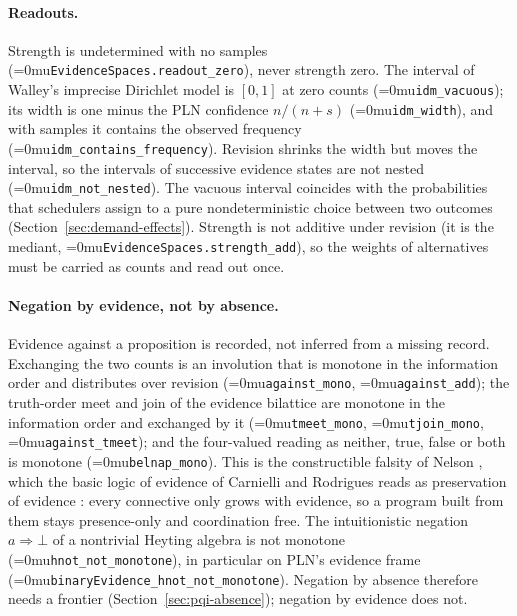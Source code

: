 \documentclass[11pt]{article}
\newcommand{\leanname}[1]{\textup{\Urlmuskip=0mu\relax\nolinkurl{#1}}}
\theoremstyle{definition}
\theoremstyle{remark}
\begin{document}
\paragraph{Readouts.}
Strength is undetermined with no samples
(\leanname{EvidenceSpaces.readout_zero}), never strength zero.  The interval of
Walley's imprecise Dirichlet model \cite{WalleyBagOfMarbles} is $[0,1]$ at zero
counts (\leanname{idm_vacuous}); its width is one minus the PLN confidence
$n/(n+s)$ (\leanname{idm_width}), and with samples it contains the observed
frequency (\leanname{idm_contains_frequency}).  Revision shrinks the width but
moves the interval, so the intervals of successive evidence states are not
nested (\leanname{idm_not_nested}).  The vacuous interval coincides with the
probabilities that schedulers assign to a pure nondeterministic choice between
two outcomes (Section~\ref{sec:demand-effects}).  Strength is not additive
under revision (it is the mediant, \leanname{EvidenceSpaces.strength_add}), so
the weights of alternatives must be carried as counts and read out once.

\paragraph{Negation by evidence, not by absence.}
Evidence against a proposition is recorded, not inferred from a missing
record.  Exchanging the two counts is an involution that is monotone in the
information order and distributes over revision
(\leanname{against_mono}, \leanname{against_add}); the truth-order meet and join
of the evidence bilattice are monotone in the information order and exchanged
by it (\leanname{tmeet_mono}, \leanname{tjoin_mono}, \leanname{against_tmeet}); and
the four-valued reading as neither, true, false or both \cite{BelnapFourValued}
is monotone (\leanname{belnap_mono}).  This is the constructible falsity of
Nelson \cite{NelsonConstructibleFalsity}, which the basic logic of evidence of
Carnielli and Rodrigues reads as preservation of evidence
\cite{CarnielliRodriguesLET}: every connective only grows with evidence, so a
program built from them stays presence-only and coordination free.  The
intuitionistic negation $a\Rightarrow\bot$ of a nontrivial Heyting algebra is
not monotone (\leanname{hnot_not_monotone}), in particular on PLN's evidence
frame (\leanname{binaryEvidence_hnot_not_monotone}).  Negation by absence
therefore needs a frontier (Section~\ref{sec:pqi-absence}); negation by
evidence does not.
\end{document}
